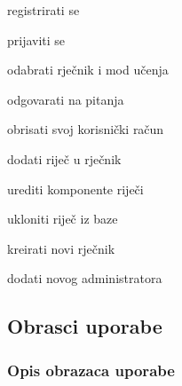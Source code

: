 			
			\begin{packed_enum}
				\item  {}
				
				\begin{packed_enum}
					
					\item registrirati se
					\item prijaviti se
%						
%				
					\item odabrati rječnik i mod učenja
					\item odgovarati na pitanja
					\item obrisati svoj korisnički račun
					
				\end{packed_enum}
			
				\item  {}
				
				\begin{packed_enum}
					
					\item dodati riječ u rječnik
					\item urediti komponente riječi
					\item ukloniti riječ iz baze
					\item kreirati novi rječnik
					\item dodati novog administratora
										
				\end{packed_enum}
			\end{packed_enum}
			
			\eject 
			
			
				
			\subsection{Obrasci uporabe}
				
				
				\subsubsection{Opis obrazaca uporabe}
					


